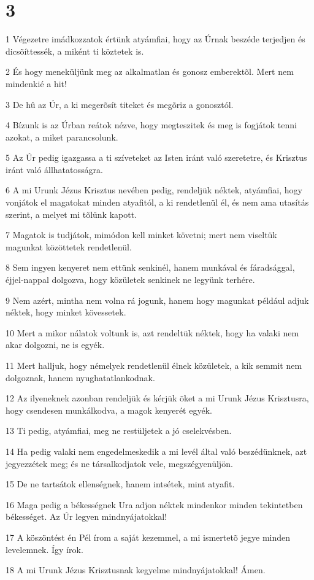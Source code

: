 \chapter{3}

\par 1 Végezetre imádkozzatok értünk atyámfiai, hogy az Úrnak beszéde terjedjen és dicsõíttessék, a miként ti köztetek is.
\par 2 És hogy meneküljünk meg az alkalmatlan és gonosz emberektõl. Mert nem mindenkié a hit!
\par 3 De hû az Úr, a ki megerõsít titeket és megõriz a gonosztól.
\par 4 Bízunk is az Úrban reátok nézve, hogy megteszitek és meg is fogjátok tenni azokat, a miket parancsolunk.
\par 5 Az Úr pedig igazgassa a ti szíveteket az Isten iránt való szeretetre, és Krisztus iránt való állhatatosságra.
\par 6 A mi Urunk Jézus Krisztus nevében pedig, rendeljük néktek, atyámfiai, hogy vonjátok el magatokat minden atyafitól, a ki rendetlenül él, és nem ama utasítás szerint, a melyet mi tõlünk kapott.
\par 7 Magatok is tudjátok, mimódon kell minket követni; mert nem viseltük magunkat közöttetek rendetlenül.
\par 8 Sem ingyen kenyeret nem ettünk senkinél, hanem munkával és fáradsággal, éjjel-nappal dolgozva, hogy közületek senkinek ne legyünk terhére.
\par 9 Nem azért, mintha nem volna rá jogunk, hanem hogy magunkat például adjuk néktek, hogy minket kövessetek.
\par 10 Mert a mikor nálatok voltunk is, azt rendeltük néktek, hogy ha valaki nem akar dolgozni, ne is egyék.
\par 11 Mert halljuk, hogy némelyek rendetlenül élnek közületek, a kik semmit nem dolgoznak, hanem nyughatatlankodnak.
\par 12 Az ilyeneknek azonban rendeljük és kérjük õket a mi Urunk Jézus Krisztusra, hogy csendesen munkálkodva, a magok kenyerét egyék.
\par 13 Ti pedig, atyámfiai, meg ne restüljetek a jó cselekvésben.
\par 14 Ha pedig valaki nem engedelmeskedik a mi levél által való beszédünknek, azt jegyezzétek meg; és ne társalkodjatok vele, megszégyenüljön.
\par 15 De ne tartsátok ellenségnek, hanem intsétek, mint atyafit.
\par 16 Maga pedig a békességnek Ura adjon néktek mindenkor minden tekintetben békességet. Az Úr legyen mindnyájatokkal!
\par 17 A köszöntést én Pél írom a saját kezemmel, a mi ismertetõ jegye minden levelemnek. Így írok.
\par 18 A mi Urunk Jézus Krisztusnak kegyelme mindnyájatokkal! Ámen.


